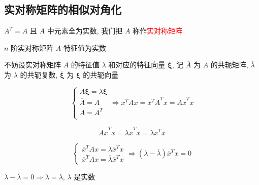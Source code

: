 \subsection{实对称矩阵的相似对角化}
\begin{definition}[实对称矩阵]
	$A^{T} = A$ 且 $A$ 中元素全为实数, 我们把 $A$ 称作\textcolor{red}{实对称矩阵}
\end{definition}
\begin{theorem}[实对称矩阵特征值]
	$n$ 阶实对称矩阵 $A$ 特征值为实数

	不妨设实对称矩阵 $A$ 的特征值 $\lambda$ 和对应的特征向量 $\boldsymbol{\xi}$, 记 $\overline{A}$ 为 $A$ 的共轭矩阵, 
	$\overline{\lambda}$ 为 $\lambda$ 的共轭复数, $\overline{\boldsymbol{\xi}}$ 为 $\boldsymbol{\xi}$ 的共轭向量

	$$\begin{cases}
	  A\boldsymbol{\xi} = \lambda\boldsymbol{\xi}\\
	  \overline{A} = A\\
	  A = A^{T}\\
	\end{cases}\Rightarrow
	\overline{x}^{T}Ax = \overline{x}^{T}\overline{A}^{T}x = \overline{Ax}^{T}x$$

	$$\overline{Ax}^{T}x = \overline{\lambda x}^{T}x = \overline{\lambda} \overline{x}^{T}x$$

	$$\begin{cases}
		\overline{x}^{T}Ax = \lambda \overline{x}^{T}x\\
		\overline{x}^{T}Ax = \overline{\lambda} \overline{x}^{T}x
	\end{cases}\Rightarrow (\lambda - \overline{\lambda}) \overline{x}^{T}x = 0$$

	$\lambda - \overline{\lambda} = 0 \Rightarrow \lambda = \overline{\lambda}$, $\lambda$ 是实数
\end{theorem}

